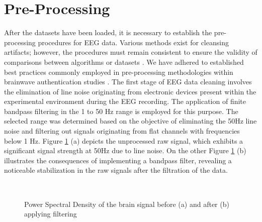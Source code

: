 \section{Pre-Processing}
\label{sec:Framework:Pre-Processing}
After the datasets have been loaded, it is necessary to establish the pre-processing procedures for EEG data. Various methods exist for cleansing artifacts; however, the procedures must remain consistent to ensure the validity of comparisons between algorithms or datasets \cite{moabb}. 
We have adhered to established best practices commonly employed in pre-processing methodologies within brainwave authentication studies \cite{survey_brain_biometrics}. 
The first stage of EEG data cleaning involves the elimination of line noise originating from electronic devices present within the experimental environment during the EEG recording. The application of finite bandpass filtering in the 1 to 50 Hz range is employed for this purpose. The selected range was determined based on the objective of eliminating the 50Hz line noise and filtering out signals originating from flat channels with frequencies below 1 Hz. Figure \ref{fig:PSD strength after band pass filtering} (a) depicts the unprocessed raw signal, which exhibits a significant signal strength at 50Hz due to line noise. On the other Figure \ref{fig:PSD strength after band pass filtering} (b) illustrates the consequences of implementing a bandpass filter, revealing a noticeable stabilization in the raw signals after the filtration of the data.  
\begin{figure}
    \centering
    \\
    \caption{Power Spectral Density of the brain signal before (a) and after (b) applying filtering}
    \label{fig:PSD strength after band pass filtering}
\end{figure}
